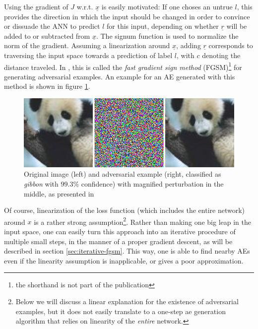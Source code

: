\documentclass[11pt, a4paper]{article}
\renewcommand{\vec}[1]{\underline{#1}}
\begin{document}
Using the gradient of $J$ w.r.t. $\vec{x}$ is easily motivated: If one choses an untrue $l$, this provides the direction in which the input should be changed in order to convince or dissuade the ANN to predict $l$ for this input, depending on whether $\vec{r}$ will be added to or subtracted from $\vec{x}$. The signum function is used to normalize the norm of the gradient. Assuming a linearization around $\vec{x}$, adding $\vec{r}$ corresponds to traversing the input space towards a prediction of label $l$, with $c$ denoting the distance traveled. In \cite{explaining-and-harnessing-adversarial-examples}, this is called the \emph{fast gradient sign method} (FGSM)\footnote{the shorthand is not part of the publication} for generating adversarial examples. An example for an AE generated with this method is shown in figure \ref{fig:harnessing-ae}.

\begin{figure}[h!tb]
	\centering
	\includegraphics[width=\textwidth]{images/harnessing_ae.png}
	\caption[Adversarial example created via FGSM, from \cite{explaining-and-harnessing-adversarial-examples}]{Original image (left) and adversarial example (right, classified as \emph{gibbon} with $99.3\%$ confidence) with magnified perturbation in the middle, as presented in \cite{explaining-and-harnessing-adversarial-examples}}
	\label{fig:harnessing-ae}
\end{figure}

Of course, linearization of the loss function (which includes the entire network) around $x$ is a rather strong assumption\footnote{Below we will discuss a linear explanation for the existence of adversarial examples, but it does not easily translate to a one-step ae generation algorithm that relies on linearity of the \emph{entire} network.}. Rather than making one big leap in the input space, one can easily turn this approach into an iterative procedure of multiple small steps, in the manner of a proper gradient descent, as will be described in section \ref{sec:iterative-fgsm}. This way, one is able to find nearby AEs even if the linearity assumption is inapplicable, or gives a poor approximation.
\end{document}

